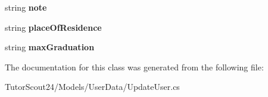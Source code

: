 \begin{DoxyCompactItemize}
\mbox{\label{class_tutor_scout24_1_1_models_1_1_user_data_1_1_update_user_ad04c22400e6528686d8c1d42c622389d}} 
string {\bfseries note}
\item 
\mbox{\label{class_tutor_scout24_1_1_models_1_1_user_data_1_1_update_user_acd0b1aace801330c6e6ec12683ba922b}} 
string {\bfseries place\+Of\+Residence}
\item 
\mbox{\label{class_tutor_scout24_1_1_models_1_1_user_data_1_1_update_user_aefcc119b68b89fd0cddd0b04dc654afa}} 
string {\bfseries max\+Graduation}
\end{DoxyCompactItemize}


The documentation for this class was generated from the following file\+:\begin{DoxyCompactItemize}
\item 
Tutor\+Scout24/\+Models/\+User\+Data/Update\+User.\+cs\end{DoxyCompactItemize}

